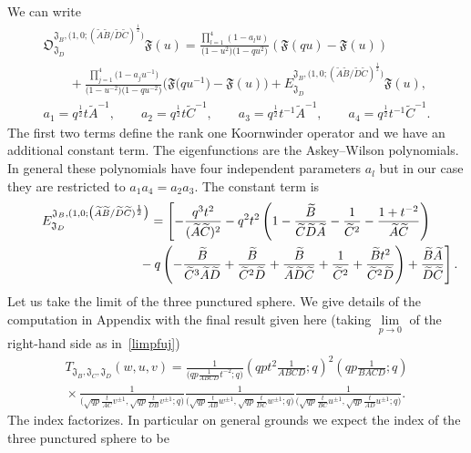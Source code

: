 \documentclass[a4paper,12pt]{article}
\begin{document}
We can write
\begin{gather*}
{\mathfrak O}_{{\mathfrak J}_D}^{{\mathfrak J}_B,\big(1,0;(\widetilde A \widetilde B/ \widetilde D \widetilde C)^{\frac12}\big)} {\mathfrak F}(u)=
\frac{\prod\limits_{l=1}^4(1- a_l u)}{\big(1-u^2\big)\big(1-q u^2\big)}({\mathfrak F}(q u)-{\mathfrak F}(u))\\
\qquad{}
+\frac{\prod\limits_{j=1}^4\big(1- a_j u^{-1}\big)}{\big(1-u^{-2}\big)\big(1-q u^{-2}\big)}\big({\mathfrak F}\big(q u^{-1}\big)-{\mathfrak F}(u)\big)
 +E_{{\mathfrak J}_D}^{{\mathfrak J}_B,\big(1,0;(\widetilde A \widetilde B / \widetilde D \widetilde C)^{\frac12}\big)} {\mathfrak F}(u) ,\\
a_1=q^{\frac12}t \widetilde A^{-1} ,\qquad
a_2=q^{\frac12}t \widetilde C^{-1} ,\qquad
a_3=q^{\frac12}t^{-1} \widetilde A^{-1} ,\qquad
a_4=q^{\frac12}t^{-1} \widetilde C^{-1}.
\end{gather*} The first two terms define the rank one Koornwinder operator  and we have an additional constant term. The eigenfunctions are the Askey--Wilson polynomials. In general these polynomials have four independent parameters $a_l$ but in our case they are restricted to $a_1 a_4 =a_2 a_3$. The constant term is
\begin{gather*}
E_{{\mathfrak J}_D}^{{\mathfrak J}_B,(1,0;\big(\widetilde A \widetilde B / \widetilde D
\widetilde C)^{\frac12}\big)}=\left[-\frac{q^3t^2}{ (\widetilde A \widetilde C)^2}-q^2t^2\left(1-\frac{\widetilde B}{\widetilde C\widetilde D\widetilde A}-\frac1{\widetilde C^2}-\frac{1+t^{-2}}{\widetilde A\widetilde C}\right)\right. \\
\left.\hphantom{E_{{\mathfrak J}_D}^{{\mathfrak J}_B,(1,0;\big(\widetilde A \widetilde B / \widetilde D \widetilde C)^{\frac12}\big)}=}{}
 - q\left(-\frac{\widetilde B}{\widetilde C^3\widetilde A\widetilde D}+\frac{\widetilde B}{\widetilde C^2\widetilde D}+\frac{\widetilde B}{\widetilde A\widetilde D\widetilde C}+\frac1{\widetilde C^2}+\frac{\widetilde B t^2}{\widetilde C^2 \widetilde D}\right)+\frac{\widetilde B\widetilde A}{\widetilde D \widetilde C}\right].
\end{gather*}
Let us take the limit of the three punctured sphere. We give details of the computation in Appendix with the final result given here (taking $\lim\limits_{p\to 0}$ of the right-hand side as in~\eqref{limpfuj})
\begin{gather}
 T_{{\mathfrak J}_B,{\mathfrak J}_C,{\mathfrak J}_D}(w,u,v)= \frac1{\big(q p\frac1{ABC D}t^{-2};q\big)} \left(q p t^2 \frac1{A BC D};q\right)^2\left(q p \frac1{B A C D};q\right) \\
{} \times \frac1{\big(\sqrt{ q p} \frac{t}{AC} v^{\pm1},\sqrt{q p}\frac{t}{D B}v^{\pm1};q\big)}
\frac1{\big(\sqrt{q p} \frac{t}{AB}w^{\pm1},\sqrt{ q p} \frac{t}{D C} w^{\pm1};q\big)}\frac1{
\big(\sqrt{q p } \frac{t}{B C} u^{\pm1},\sqrt {q p } \frac{ t}{ A D } u^{\pm1};q\big)} . \nonumber
\end{gather} The index factorizes. In particular on general grounds  we expect the index of the three punctured sphere to be
\end{document}
